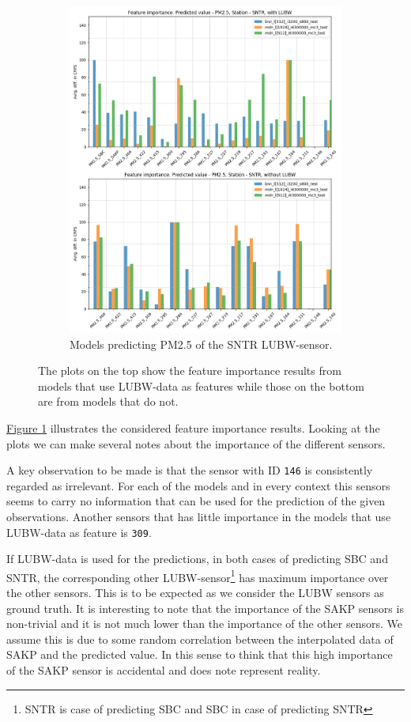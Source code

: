 \documentclass[12pt,a4paper,twoside]{scrartcl}
\numberwithin{equation}{section}
\newcommand{\reffig}[1]{\hyperref[#1]{Figure \ref*{#1}}}
\begin{document}
\begin{figure}[H]
\begin{subfigure}[t]{0.49\textwidth}
    \includegraphics[width=\textwidth,height=1.2\textwidth]{figures/figs_1d/feature_importance_CRPS_SNTR_P2}%
    \caption{Models predicting PM2.5 of the SNTR LUBW-sensor.}
  \end{subfigure}
  \caption[Feature importance (daily average)]{The plots on the top show the feature importance results from models that use LUBW-data as features while those on the bottom are from models that do not.}\label{fig:feat-imp-1d}
\end{figure}
\reffig{fig:feat-imp-1d} illustrates the considered feature importance results. Looking at the plots we can make several notes about the importance of the different sensors.

A key observation to be made is that the sensor with ID \texttt{146} is consistently regarded as irrelevant. For each of the models and in every context this sensors seems to carry no information that can be used for the prediction of the given observations. Another sensors that has little importance in the models that use LUBW-data as feature is \texttt{309}.

If LUBW-data is used for the predictions, in both cases of predicting SBC and SNTR, the corresponding other LUBW-sensor\footnote{SNTR is case of predicting SBC and SBC in case of predicting SNTR} has maximum importance over the other sensors. This is to be expected as we consider the LUBW sensors as ground truth. It is interesting to note that the importance of the SAKP sensors is non-trivial and it is not much lower than the importance of the other sensors. We assume this is due to some random correlation between the interpolated data of SAKP and the predicted value. In this sense to think that this high importance of the SAKP sensor is accidental and does note represent reality.
\end{document}
